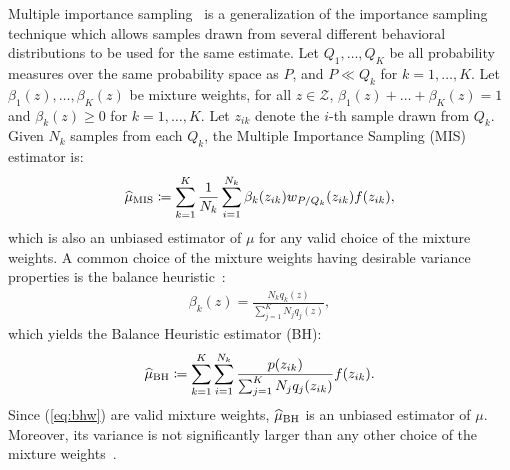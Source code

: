 \documentclass{article}
\begin{document}
Multiple importance sampling~\citep{veach_optimally_1995} is a generalization of the importance sampling technique which allows samples drawn from several different behavioral distributions to be used for the same estimate.
Let $Q_1,\dots,Q_K$ be all probability measures over the same probability space as $P$, and $P\ll Q_k$ for $k=1,\dots,K$. Let $\beta_1(z),\dots,\beta_K(z)$ be mixture weights, \ie for all $z\in\mathcal{Z}$, ${\beta_1(z)+\dots+\beta_K(z) = 1}$ and $\beta_k(z)\geq0$ for ${k=1,\dots,K}$. Let $z_{ik}$ denote the $i$-th sample drawn from $Q_k$. Given $N_k$ \iid samples from each $Q_k$, the Multiple Importance Sampling (MIS) estimator is:
\begin{align}\label{eq:mise}
	\widehat{\mu}_{\text{MIS}} \coloneqq \sum_{k=1}^K\frac{1}{N_k}\sum_{i=1}^{N_k}\beta_k(z_{ik})w_{P/Q_k}(z_{ik})f(z_{ik}),
\end{align}
which is also an unbiased estimator of $\mu$ for any valid choice of the mixture weights. A common choice of the mixture weights having desirable variance properties is the balance heuristic~\citep{veach_optimally_1995}: 
\begin{align}\label{eq:bhw}
	\beta_k(z) = \frac{N_kq_k(z)}{\sum_{j=1}^{K}N_jq_j(z)},
\end{align}
which yields the Balance Heuristic estimator (BH):
\begin{align}\label{eq:bhe}
	\widehat{\mu}_{\text{BH}} \coloneqq \sum_{k=1}^K\sum_{i=1}^{N_k}\frac{p(z_{ik})}{\sum_{j=1}^K N_jq_j(z_{ik})}f(z_{ik}).
\end{align}
Since (\ref{eq:bhw}) are valid mixture weights, $\widehat{\mu}_{\text{BH}}$ is an unbiased estimator of $\mu$. Moreover, its variance is not significantly larger than any other choice of the mixture weights~\citep[][Theorem 1]{veach_optimally_1995}. 
\end{document}
